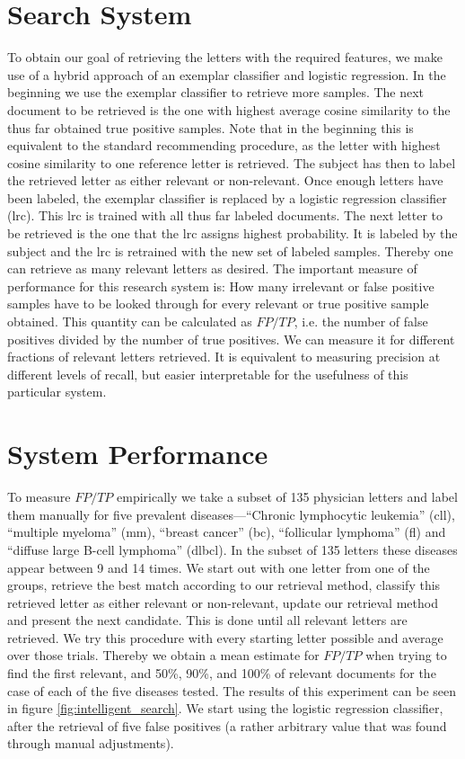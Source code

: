 \section{Search System}
To obtain our goal of retrieving the letters with the required features, we make use of a hybrid approach of an exemplar classifier and logistic regression. In the beginning we use the exemplar classifier to retrieve more samples. The next document to be retrieved is the one with highest average cosine similarity to the thus far obtained true positive samples. Note that in the beginning this is equivalent to the standard recommending procedure, as the letter with highest cosine similarity to one reference letter is retrieved. The subject has then to label the retrieved letter as either relevant or non-relevant. Once enough letters have been labeled, the exemplar classifier is replaced by a logistic regression classifier (lrc). This lrc is trained with all thus far labeled documents. The next letter to be retrieved is the one that the lrc assigns highest probability. It is labeled by the subject and the lrc is retrained with the new set of labeled samples. Thereby one can retrieve as many relevant letters as desired. The important measure of performance for this research system is: How many irrelevant or false positive samples have to be looked through for every relevant or true positive sample obtained. This quantity can be calculated as $FP/TP$, i.e. the number of false positives divided by the number of true positives. We can measure it for different fractions of relevant letters retrieved. It is equivalent to measuring precision at different levels of recall, but easier interpretable for the usefulness of this particular system.

\section{System Performance}
To measure $FP/TP$ empirically we take a subset of 135 physician letters and label them manually for five prevalent diseases---``Chronic lymphocytic leukemia'' (cll), ``multiple myeloma'' (mm), ``breast cancer'' (bc), ``follicular lymphoma'' (fl) and ``diffuse large B-cell lymphoma'' (dlbcl). In the subset of 135 letters these diseases appear between 9 and 14 times. We start out with one letter from one of the groups, retrieve the best match according to our retrieval method, classify this retrieved letter as either relevant or non-relevant, update our retrieval method and present the next candidate. This is done until all relevant letters are retrieved. We try this procedure with every starting letter possible and average over those trials. Thereby we obtain a mean estimate for $FP/TP$ when trying to find the first relevant, and 50\%, 90\%, and 100\% of relevant documents for the case of each of the five diseases tested. The results of this experiment can be seen in figure \ref{fig:intelligent_search}. We start using the logistic regression classifier, after the retrieval of five false positives (a rather arbitrary value that was found through manual adjustments).

